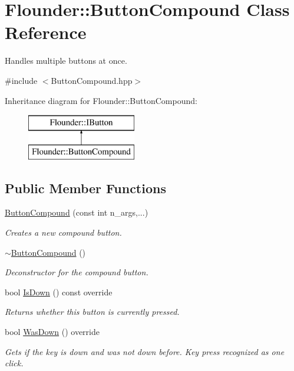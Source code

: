 \hypertarget{class_flounder_1_1_button_compound}{}\section{Flounder\+:\+:Button\+Compound Class Reference}
\label{class_flounder_1_1_button_compound}


Handles multiple buttons at once.  




{\ttfamily \#include $<$Button\+Compound.\+hpp$>$}

Inheritance diagram for Flounder\+:\+:Button\+Compound\+:\begin{figure}[H]
\begin{center}
\leavevmode
\includegraphics[height=2.000000cm]{class_flounder_1_1_button_compound}
\end{center}
\end{figure}
\subsection*{Public Member Functions}
\begin{DoxyCompactItemize}
\item 
\hyperlink{class_flounder_1_1_button_compound_ae08de283f9875ae9b84c25742cb3af64}{Button\+Compound} (const int n\+\_\+args,...)
\begin{DoxyCompactList}\small\item\em Creates a new compound button. \end{DoxyCompactList}\item 
\hyperlink{class_flounder_1_1_button_compound_a5331cca1659eea63029b6522bfde408b}{$\sim$\+Button\+Compound} ()
\begin{DoxyCompactList}\small\item\em Deconstructor for the compound button. \end{DoxyCompactList}\item 
bool \hyperlink{class_flounder_1_1_button_compound_a168866bc6410f111f9c8a98b1ec83dd6}{Is\+Down} () const override
\begin{DoxyCompactList}\small\item\em Returns whether this button is currently pressed. \end{DoxyCompactList}\item 
bool \hyperlink{class_flounder_1_1_button_compound_a89f7e5a22a14d10a02974955f3fac8d1}{Was\+Down} () override
\begin{DoxyCompactList}\small\item\em Gets if the key is down and was not down before. Key press recognized as one click. \end{DoxyCompactList}\end{DoxyCompactItemize}

